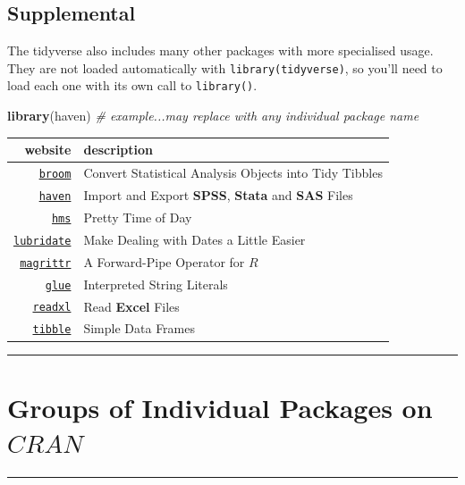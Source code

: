 \documentclass[]{book}
\newenvironment{Shaded}{\begin{snugshade}}{\end{snugshade}}
\newcommand{\KeywordTok}[1]{\textcolor[rgb]{0.13,0.29,0.53}{\textbf{#1}}}
\newcommand{\CommentTok}[1]{\textcolor[rgb]{0.56,0.35,0.01}{\textit{#1}}}
\newcommand{\NormalTok}[1]{#1}
\theoremstyle{definition}
\theoremstyle{definition}
\theoremstyle{definition}
\theoremstyle{remark}
\begin{document}
\subsection{Supplemental}\label{supplemental}

The tidyverse also includes many other packages with more specialised
usage. They are not loaded automatically with
\texttt{library(tidyverse)}, so you'll need to load each one with its
own call to \texttt{library()}.

\begin{Shaded}
\begin{Highlighting}[]
\KeywordTok{library}\NormalTok{(haven) }\CommentTok{# example...may replace with any individual package name}
\end{Highlighting}
\end{Shaded}

\begin{longtable}[]{@{}rl@{}}
\toprule
website & description\tabularnewline
\midrule
\endhead
\href{https://github.com/tidymodels/broom}{\texttt{broom}} & Convert
Statistical Analysis Objects into Tidy Tibbles\tabularnewline
\href{https://haven.tidyverse.org/}{\texttt{haven}} & Import and Export
\textbf{SPSS}, \textbf{Stata} and \textbf{SAS} Files\tabularnewline
\href{https://github.com/tidyverse/hms}{\texttt{hms}} & Pretty Time of
Day\tabularnewline
\href{https://lubridate.tidyverse.org/}{\texttt{lubridate}} & Make
Dealing with Dates a Little Easier\tabularnewline
\href{https://magrittr.tidyverse.org/}{\texttt{magrittr}} & A
Forward-Pipe Operator for \textbf{\(R\)}\tabularnewline
\href{https://github.com/tidyverse/glue}{\texttt{glue}} & Interpreted
String Literals\tabularnewline
\href{https://readxl.tidyverse.org/}{\texttt{readxl}} & Read
\textbf{Excel} Files\tabularnewline
\href{https://tibble.tidyverse.org/}{\texttt{tibble}} & Simple Data
Frames\tabularnewline
\bottomrule
\end{longtable}

\begin{center}\rule{0.5\linewidth}{\linethickness}\end{center}

\section{\texorpdfstring{Groups of Individual Packages on
\(CRAN\)}{Groups of Individual Packages on CRAN}}\label{groups-of-individual-packages-on-cran}

\begin{center}\rule{0.5\linewidth}{\linethickness}\end{center}
\end{document}
